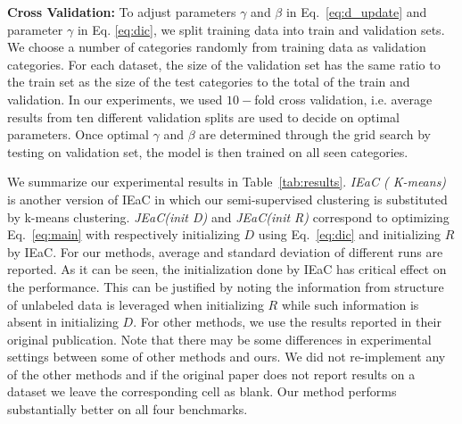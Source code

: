 \documentclass[letterpaper]{article}
\begin{document}

\textbf{Cross Validation:}
To adjust parameters $\gamma$ and $\beta$ in Eq.~\eqref{eq:d_update} and parameter $\gamma$ in Eq. \eqref{eq:dic}, we split training data into train and validation sets.
We choose a number of categories randomly from training data as validation categories. For each dataset, the size of the
validation set has the same ratio to the train set as the size of the test categories to the total of the train and validation.
In our experiments, we used $10-$fold cross validation, i.e. average results from ten different validation splits are used to decide on
optimal parameters.
Once optimal $\gamma$ and $\beta$ are determined through the grid search by testing on validation set, the model
is then trained on all seen categories.

We summarize our experimental results in Table~\ref{tab:results}.
\textit{IEaC ( K-means)} is another version of IEaC in which our semi-supervised clustering is substituted by k-means clustering.
\textit{JEaC(init D)} and \textit{JEaC(init R)} correspond to optimizing Eq.~\eqref{eq:main}
with respectively initializing $D$ using Eq.~\eqref{eq:dic} and initializing $R$ by IEaC.
For our methods, average and standard deviation of different runs are reported. As it can be seen, the initialization done
by IEaC has critical effect on the performance. This can be justified by noting the information from structure of
unlabeled data is leveraged when initializing $R$ while such information is absent in initializing $D$.
%
For other methods, we use the results reported in their original publication.
Note that there may be some differences in experimental settings between some of other methods and ours.
 We did not re-implement any of the other methods and if the original paper does not report results on a dataset we leave the corresponding cell as blank.
Our method performs substantially better on all four benchmarks.
\end{document}
